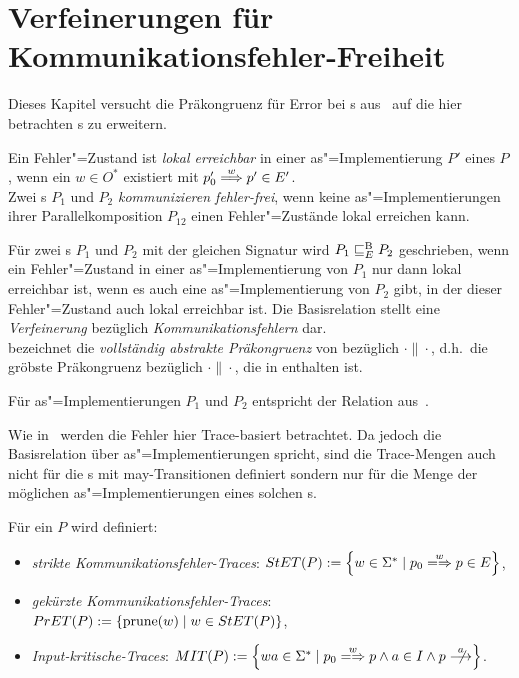 \chapter{Verfeinerungen für Kommunikationsfehler-Freiheit}

Dieses Kapitel versucht die Präkongruenz für Error bei \EIO{}s
aus~\cite{Schinko2016BA} auf die hier betrachten \MEIO{}s zu erweitern.

\begin{Def}
  Ein Fehler"=Zustand ist \emph{lokal erreichbar} in einer
  as"=Implementierung $P'$ eines \MEIO{} $P$, wenn ein $w\in O^*$ existiert mit
  $p'_0 \weakmust[w]p'\in E'$.\\
  Zwei \MEIO{}s $P_1$ und $P_2$ \emph{kommunizieren fehler-frei}, wenn keine
  as"=Implementierungen ihrer Parallelkomposition $P_{12}$ einen
  Fehler"=Zustände lokal erreichen kann.
\end{Def}

\begin{Def}
  Für zwei \MEIO{}s $P_1$ und $P_2$ mit der gleichen Signatur wird $P_1 \sqsubseteq  _E^\mathrm{B}{} P_2$
  geschrieben, wenn ein Fehler"=Zustand in einer as"=Implementierung
  von $P_1$ nur dann lokal erreichbar ist, wenn es auch eine as"=Implementierung
  von $P_2$ gibt, in der dieser Fehler"=Zustand auch lokal
  erreichbar ist. Die Basisrelation stellt eine \emph{Verfeinerung} bezüglich
  \emph{Kommunikationsfehlern} dar.\\
  \ECRel{} bezeichnet die \emph{vollständig abstrakte Präkongruenz} von
  \EBRel{} bezüglich $\cdot\|\cdot$, d.h.\ die gröbste Präkongruenz bezüglich
  $\cdot\|\cdot$, die in \EBRel{} enthalten ist.
\end{Def}

Für as"=Implementierungen $P_1$ und $P_2$ entspricht \EBRel{} der Relation
\EBbaRel{} aus~\cite{Schinko2016BA}.

Wie in~\cite{Schinko2016BA} werden die Fehler hier Trace-basiert betrachtet. Da
jedoch die Basisrelation über as"=Implementierungen spricht, sind die Trace-Mengen
auch nicht für die \MEIO{}s mit may-Transitionen definiert sondern nur für die
Menge der möglichen as"=Implementierungen eines solchen \MEIO{}s.

\begin{Def}
  Für ein \MEIO{} $P$ wird definiert:
  \begin{itemize}
    \item \emph{strikte Kommunikationsfehler-Traces}: $\StET (P) :=
      \left\{w\in\Sigma ^* \mid p_0 \weakmay[w] p \in E\right\}$,
    \item \emph{gekürzte Kommunikationsfehler-Traces}: $PrET (P) :=
      \left\{\mathrm{prune} (w) \mid w\in StET (P)\right\}$,
    \item \emph{Input-kritische-Traces}: $\MIT (P) := \left\{wa\in\Sigma ^*
      \mid p_0 \weakmay[w] p \land a\in I\land p\nmust[a] \right\}$.
  \end{itemize}
\end{Def}


